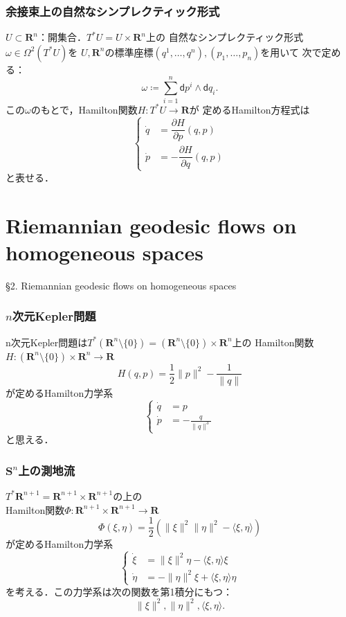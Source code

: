 \documentclass[11pt,%
dvipdfmx,cjk]{beamer}
\newcommand{\rr}{\mathbf{R}}
\def\inner<#1>{\langle #1 \rangle}
\begin{document}
\begin{frame}
\frametitle{余接束上の自然なシンプレクティック形式}
\(U \subset \rr^{n}\)：開集合．\(T^{*}U = U \times \rr^{n}\)上の
自然なシンプレクティック形式\(\omega \in \Omega^{2}(T^{*}U)\)を
\(U, \rr^{n}\)の標準座標\((q^{1}, \dots, q^{n}), (p_{1}, \dots, p_{n})\)を用いて
次で定める：
\[
	\omega \coloneqq \sum_{i = 1}^{n} \mathsf{d}p^{i} \wedge \mathsf{d}q_{i}.
\]
この\(\omega\)のもとで，Hamilton関数\(H \colon T^{*}U \to \mathbf{R}\)が
定めるHamilton方程式は
\[
\begin{cases}
\dot{q} &=  \dfrac{\partial H}{\partial p}(q,p) \\
\dot{p} &=   - \dfrac{\partial H}{\partial q}(q,p)
\end{cases}
\]
と表せる．
\end{frame}

\section[Geodesics on homogeneous spaces]{Riemannian geodesic flows on homogeneous spaces}
\begin{frame}
\S 2. Riemannian geodesic flows on homogeneous spaces
\end{frame}

\begin{frame}
\frametitle{\(n\)次元Kepler問題}
n次元Kepler問題は\(T^{*}(\rr^{n} \setminus \{0\}) = 
(\rr^{n} \setminus \{0\}) \times \rr^{n}\)上の
Hamilton関数\(H\colon(\rr^{n} \setminus \{0\}) \times \rr^{n} \to \rr\)
\[
	H(q,p) = \frac{1}{2}\|p\|^{2} - \frac{1}{\|q\|}
\]
が定めるHamilton力学系
\[
\begin{cases}
	\dot{q} &=  p \qquad \\
	\dot{p} &= - \frac{q}{\|q\|^{3}} 
\end{cases}
\]
と思える．
\end{frame}

\begin{frame}
\frametitle{\(\mathbf{S}^{n}\)上の測地流}
\(T^{*}\rr^{n+1} = \rr^{n + 1} \times \rr^{n + 1}\)の上の\\
Hamilton関数\(\Phi:\rr^{n + 1} \times \rr^{n + 1} \to \rr\)
\[
	\Phi(\xi, \eta) = \frac{1}{2}(\|\xi\|^{2}\|\eta\|^{2} - \inner<\xi, \eta>)
\]
が定めるHamilton力学系
\[
\begin{cases}
	\dot{\xi} &=  \|\xi\|^{2}\eta -  \inner<\xi, \eta>\xi \\
	\dot{\eta} &= -\|\eta\|^{2}\xi + \inner<\xi, \eta>\eta
\end{cases}		
\]
を考える．この力学系は次の関数を第1積分にもつ：
\[
	\|\xi\|^{2}, \|\eta\|^{2}, \inner<\xi, \eta>.
\]
\end{frame}
\end{document}
